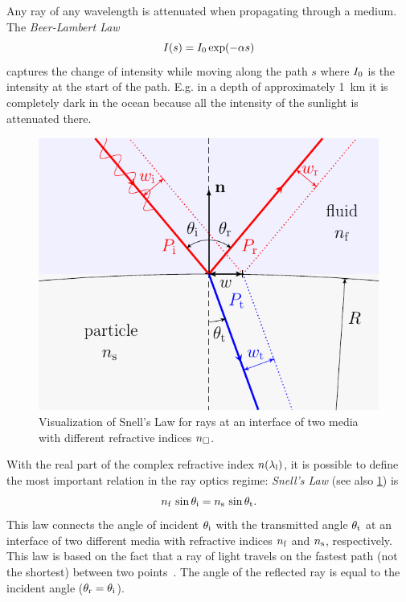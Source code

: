 Any ray of any wavelength is attenuated when propagating through a medium. The 
\emph{Beer-Lambert Law}
\begin{equation}
  I(s) = I_{0}\exp(-\alpha s)
  \label{eq:TO-beer-lambert}
\end{equation}
captures the change of intensity while moving along the path $s$ where 
$I_{0}$ is the intensity at the start of the path. E.g. in a depth of 
approximately \SI{1}{\kilo\meter} it is completely dark in the ocean because 
all the intensity of the sunlight is attenuated there.

\begin{figure}[tbp]
  \centering
  \includegraphics[]{External/Snell.pdf}
  \caption{Visualization of Snell's Law for rays at an interface of two media 
  with different refractive indices $n_{\Box}$.}
  \label{fig:TO-Snell}
\end{figure}

With the real part of the complex refractive index $n(\lambda_{\mathrm{l}})$, it is 
possible to define the most important relation in the ray optics regime: 
\emph{Snell's Law} (see also \cref{fig:TO-Snell}) is
\begin{equation}
  n_{\mathrm{f}}\,\sin\theta_{\mathrm{i}} = n_{\mathrm{s}}\,\sin\theta_{\mathrm{t}}.
  \label{eq:TO-Snell}
\end{equation}
This law connects the angle of incident $\theta_{\mathrm{i}}$ with the transmitted angle 
$\theta_{\mathrm{t}}$ at an interface of two different media with refractive indices 
$n_{\mathrm{f}}$ and $n_{\mathrm{s}}$, respectively. This law is based on the fact that a ray of 
light travels on the fastest path (not the shortest) between two 
points~\cite{Born1980Ch3}. The angle of the reflected ray is equal to the 
incident angle ($\theta_{\mathrm{r}}=\theta_{\mathrm{i}}$).

